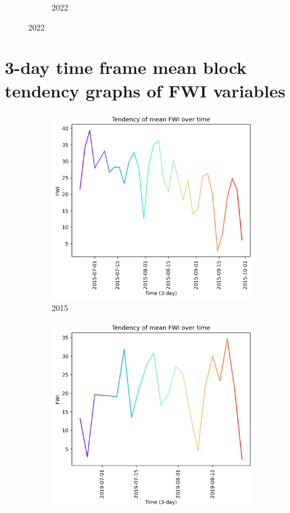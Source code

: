 \begin{figure}[h]
\begin{subfigure}{0.45\textwidth}
		\caption{2022}
	\end{subfigure}
	\label{fig:daily_bui_dif_maxmin}
\end{figure}


\FloatBarrier

\section{3-day time frame mean block tendency graphs of FWI variables}
\begin{figure}[h]
	\caption{FWI mean tendency graph}
	\centering
	\begin{subfigure}{0.49\textwidth}
		\centering
		\includegraphics[width=\textwidth]{graphs/all_time/2015_tendency_graph_FWI.png}
		\caption{2015}
		\label{fig:mean_tendency_fwi_2015}
	\end{subfigure}
	\hfill
	\begin{subfigure}{0.49\textwidth}
		\centering
		\includegraphics[width=\textwidth]{graphs/all_time/2019_tendency_graph_FWI.png}

\end{subfigure}
\end{figure}
